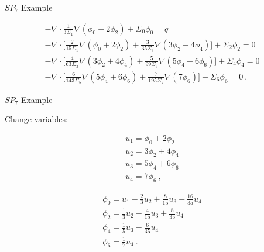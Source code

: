 \documentclass{beamer}
\begin{document}
\begin{frame}{$SP_7$ Example}

  \begin{subequations}
    \begin{gather}
      -\nabla \cdot \frac{1}{3 \Sigma_1} \nabla ( \phi_0 + 2\phi_2 ) +
      \Sigma_0 \phi_0 = q \\ 
      -\nabla \cdot \Bigg[ \frac{2}{15 \Sigma_1} \nabla ( \phi_0 + 2\phi_2
        ) + \frac{3}{35 \Sigma_3}\nabla( 3\phi_2 + 4\phi_4)\Bigg] +
      \Sigma_2 \phi_2 = 0\\
      -\nabla \cdot \Bigg[ \frac{4}{63 \Sigma_3} \nabla ( 3\phi_2 +
        4\phi_4 ) + \frac{5}{99 \Sigma_5}\nabla( 5\phi_4 +
        6\phi_6)\Bigg] + \Sigma_4 \phi_4 = 0\\
      -\nabla \cdot \Bigg[ \frac{6}{143 \Sigma_5} \nabla ( 5\phi_4 +
        6\phi_6 ) + \frac{7}{195 \Sigma_7}\nabla(7\phi_6)\Bigg] +
      \Sigma_6 \phi_6 = 0 \:.
    \end{gather}
    \label{eq:sp7_equations}
  \end{subequations}

\end{frame}

\begin{frame}{$SP_7$ Example}

  Change variables:

  \begin{subequations}
    \begin{gather}
      u_1 = \phi_0 + 2\phi_2 \\
      u_2 = 3\phi_2 + 4\phi_4 \\
      u_3 = 5\phi_4 + 6\phi_6 \\
      u_4 = 7\phi_6 \:,
    \end{gather}
    \label{eq:spn7_subs}
  \end{subequations}

  \begin{subequations}
    \begin{gather}
      \phi_0 = u_1 - \frac{2}{3}u_2 + \frac{8}{15}u_3 -
      \frac{16}{35}u_4 \\
      \phi_2 = \frac{1}{3}u_2 - \frac{4}{15}u_3 + \frac{8}{35}u_4\\ 
      \phi_4 = \frac{1}{5}u_3 - \frac{6}{35}u_4\\
      \phi_6 = \frac{1}{7}u_4\:.
    \end{gather}
    \label{eq:spn7_subs_inverse}
  \end{subequations}

\end{frame}
\end{document}
